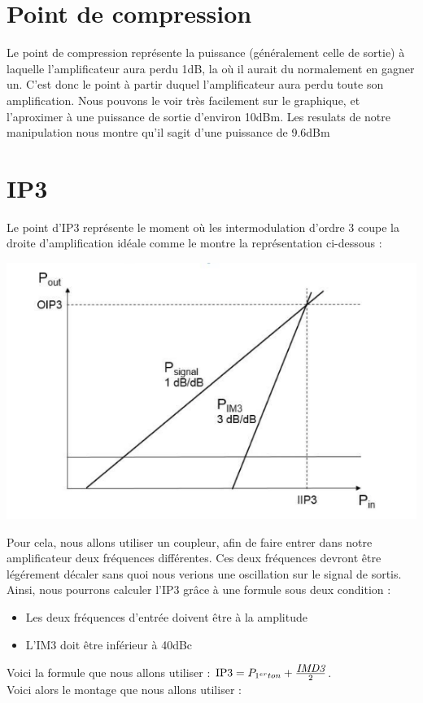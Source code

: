\documentclass[a4paper,12pt]{report}            %
\begin{document}
\section{Point de compression}

Le point de compression représente la puissance (généralement celle de sortie) à laquelle l'amplificateur
aura perdu 1dB, la où il aurait du normalement en gagner un. C'est donc le point à partir duquel l'amplificateur 
aura perdu toute son amplification.
Nous pouvons le voir très facilement sur le graphique, et l'aproximer à une puissance de sortie d'environ 10dBm.
Les resulats de notre manipulation nous montre qu'il sagit d'une puissance de 9.6dBm

\section{IP3}

Le point d'IP3 représente le moment où les intermodulation d'ordre 3 coupe la droite d'amplification idéale comme
le montre la représentation ci-dessous :

\begin{center}\includegraphics[scale = 0.4]{pic/IP3_exemple.png}\\ \end{center}

Pour cela, nous allons utiliser un coupleur, afin de faire entrer dans notre amplificateur deux fréquences différentes.
Ces deux fréquences devront être légérement décaler sans quoi nous verions une oscillation sur le signal de sortis.
Ainsi, nous pourrons calculer l'IP3 grâce à une formule sous deux condition :
\begin{itemize}
    \item Les deux fréquences d'entrée doivent être à la amplitude
    \item L'IM3 doit être inférieur à 40dBc 
\end{itemize}
Voici la formule que nous allons utiliser : $ \mbox{IP3}=P_{1^{er}ton} + \frac{\mbox{\itshape{IMD3}}}{2}$.\\
Voici alors le montage que nous allons utiliser :
\end{document}
